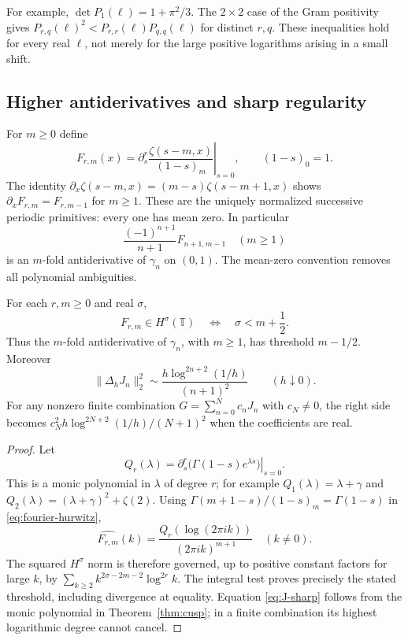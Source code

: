 For example, $\det P_1(\ell)=1+\pi^2/3$. The $2\times2$ case of
the Gram positivity gives $P_{r,q}(\ell)^2<P_{r,r}(\ell)P_{q,q}(\ell)$
for distinct $r,q$. These inequalities hold for every real $\ell$,
not merely for the large positive logarithms arising in a small shift.

\subsection{Higher antiderivatives and sharp regularity}

For $m\geq0$ define
\begin{equation}\label{eq:higher-primitive}
 F_{r,m}(x)=\left.\partial_s^r
       \frac{\zeta(s-m,x)}{(1-s)_m}\right|_{s=0},
 \qquad (1-s)_0=1.
\end{equation}
The identity $\partial_x\zeta(s-m,x)=(m-s)\zeta(s-m+1,x)$
shows $\partial_xF_{r,m}=F_{r,m-1}$ for $m\geq1$.
These are the uniquely normalized successive periodic primitives: every
one has mean zero. In particular
\[
 \frac{(-1)^{n+1}}{n+1}F_{n+1,m-1}
 \quad(m\geq1)
\]
is an $m$-fold antiderivative of $\gamma_n$ on $(0,1)$.
The mean-zero convention removes all polynomial ambiguities.

\begin{theorem}\label{thm:sobolev}
For each $r,m\geq0$ and real $\sigma$,
\[
 F_{r,m}\in H^\sigma(\mathbb T)
 \quad\Longleftrightarrow\quad \sigma<m+\frac12.
\]
Thus the $m$-fold antiderivative of $\gamma_n$, with $m\geq1$, has
threshold $m-1/2$. Moreover
\begin{equation}\label{eq:J-sharp}
 \|\Delta_hJ_n\|_2^2
 \sim\frac{h\log^{2n+2}(1/h)}{(n+1)^2}\qquad(h\downarrow0).
\end{equation}
For any nonzero finite combination $G=\sum_{n=0}^Nc_nJ_n$ with
$c_N\ne0$, the right side becomes
$c_N^2h\log^{2N+2}(1/h)/(N+1)^2$ when the coefficients are real.
\end{theorem}

\begin{proof}
Let
\[
 Q_r(\lambda)=\left.\partial_s^r
                      \bigl(\Gamma(1-s)e^{\lambda s}\bigr)\right|_{s=0}.
\]
This is a monic polynomial in $\lambda$ of degree $r$; for example
$Q_1(\lambda)=\lambda+\gamma$ and
$Q_2(\lambda)=(\lambda+\gamma)^2+\zeta(2)$.
Using $\Gamma(m+1-s)/(1-s)_m=\Gamma(1-s)$ in
\eqref{eq:fourier-hurwitz},
\begin{equation}\label{eq:primitive-fourier}
 \widehat{F_{r,m}}(k)
       =\frac{Q_r(\log(2\pi ik))}{(2\pi ik)^{m+1}}
          \quad(k\ne0).
\end{equation}
The squared $H^\sigma$ norm is therefore governed, up to positive
constant factors for large $k$, by
$\sum_{k\geq2}k^{2\sigma-2m-2}\log^{2r}k$.
The integral test proves precisely the stated threshold, including
divergence at equality. Equation \eqref{eq:J-sharp} follows from the
monic polynomial in Theorem~\ref{thm:cusp}; in a finite combination its
highest logarithmic degree cannot cancel.
\end{proof}

